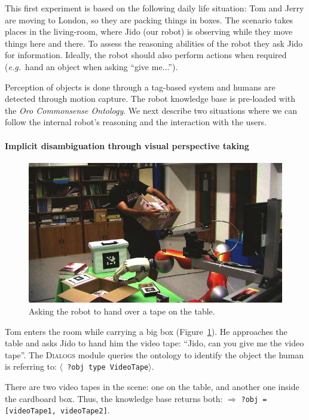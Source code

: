 \documentclass[preprint,3p,times]{elsarticle}
\newcommand{\concept}[1]{{\small \texttt{#1}}}
\newcommand{\stmt}[1]{{\footnotesize \tt $\langle$ #1\relax$\rangle$}}
\newcommand{\eg}{{\textit{e.g.\ }}}
\begin{document}
This first experiment is based on the following daily life situation: Tom and
Jerry are moving to London, so they are packing things in boxes. The scenario
takes places in the living-room, where Jido (our robot) is observing while they
move things here and there. To assess the reasoning abilities of the robot they
ask Jido for information. Ideally, the robot should
also perform actions when required (\eg hand an object when asking ``give
me...'').

Perception of objects is done through a tag-based system and humans are
detected through motion capture. The robot knowledge base is pre-loaded with
the \emph{{\sc Oro} Commonsense Ontology}.  We next describe two
situations where we can follow the internal robot's reasoning and the
interaction with the users.

\paragraph{Implicit disambiguation through visual perspective taking}

\begin{figure}[!ht]
  \centering
  \includegraphics[width=0.9\linewidth]{pt.jpg}
\caption{Asking the robot to hand over a tape on the table.}
  \label{fig|vpt}
\end{figure}


Tom enters the room while carrying a big box (Figure~\ref{fig|vpt}). He
approaches the table and asks Jido to hand him the video tape: ``Jido, can
you give me the video tape''. The \textsc{Dialogs} module queries the ontology to
identify the object the human is referring to: \stmt{?obj type VideoTape}. 

There are two video tapes in the scene: one on the table, and another one
inside the cardboard box. Thus, the knowledge base returns both: $\Rightarrow$
\concept{?obj = [videoTape1, videoTape2]}. 
\end{document}
